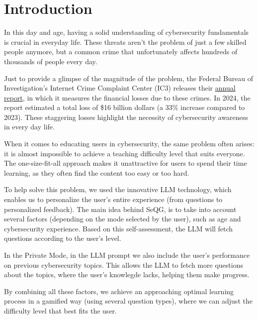 \chapter{Introduction}
In this day and age, having a solid understanding of cybersecurity fundamentals is crucial in 
everyday life. These threats aren't the problem of just a few skilled people anymore, but a common crime that unfortunately 
affects hundreds of thousands of people every day.

Just to provide a glimpse of the magnitude of the problem, the Federal Bureau of Investigation's Internet Crime Complaint Center (IC3) 
releases their \href{ https://www.ic3.gov/AnnualReport/Reports/2024_IC3Report.pdf}{annual report}, in which it measures the financial losses 
due to these crimes. In 2024, the report estimated a total loss of \$16 billion dollars 
(a 33\% increase compared to 2023). These staggering losses highlight the necessity of cybersecurity awareness in every day life.

When it comes to educating users in cybersecurity, the same problem often arises: it is almost 
impossible to achieve a teaching difficulty level that suits everyone. The one-size-fit-all approach 
makes it unattractive for users to spend their time learning, as they often find the content too easy or too hard.

To help solve this problem, we used the innovative LLM technology, which enables us to personalize the user's entire experience
(from questions to personalized feedback). The main idea behind SeQG, is to take into account several factors (depending on 
the mode selected by the user), such as age and cybersecurity experience. Based on this self-assessment, the LLM will fetch 
questions according to the user's level.

In the Private Mode, in the LLM prompt we also include the user's performance on previous cybersecurity topics. This allows
the LLM to fetch more questions about the topics, where the user's knowlegde lacks, helping them make progress.

By combining all these factors, we achieve an approaching optimal learning process in a gamified way (using several question types), 
where we can adjust the difficulty level that best fits the user.